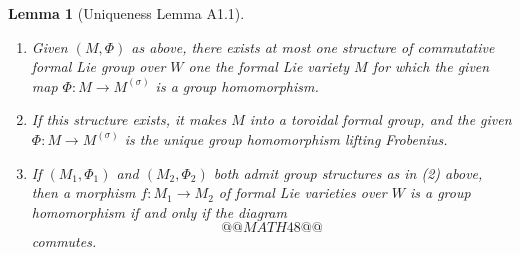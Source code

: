 \documentclass[12pt,a4paper]{article}
\theoremstyle{plain}
\newtheorem{lemma}[theorem]{Lemma}
\theoremstyle{definition}
\theoremstyle{remark}
\begin{document}
\begin{lemma}[Uniqueness Lemma A1.1]\ \begin{enumerate}[label=(\arabic*)]
\item Given $(M, \Phi)$ as above, there exists at most one structure of commutative formal Lie group over $W$ one the formal Lie variety $M$ for which the given map $\Phi : M \to M^{(\sigma)}$ is a group homomorphism.
\item If this structure exists, it makes $M$ into a toroidal formal group, and the given $\Phi : M \to M^{(\sigma)}$ is the unique group homomorphism lifting Frobenius.
\item If $(M_1, \Phi_1)$ and $(M_2, \Phi_2)$ both admit group structures as in (2) above, then a morphism $f : M_1 \to M_2$ of formal Lie varieties over $W$ is a group homomorphism if and only if the diagram
\[
@@MATH48@@
\]
commutes.
\end{enumerate}
\end{lemma}
\end{document}
